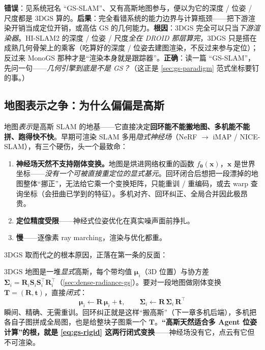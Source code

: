 \begin{pitfall}
\textbf{错误}：见系统冠名 “GS-SLAM”、又有高斯地图参与，便以为它的深度 / 位姿 / 尺度都是 3DGS 算的。\textbf{后果}：完全看错系统的能力边界与计算瓶颈——把下游渲染开销当成定位开销，或高估 GS 的几何能力。\textbf{根因}：3DGS 完全可以只当\emph{下游渲染器}。HI-SLAM2 的深度 / 位姿 / 尺度\emph{全在 DROID 那层算完}，3DGS 只是搭在成熟几何骨架上的乘客（吃算好的深度 / 位姿去建图渲染，不反过来参与定位）；反过来 MonoGS 那种才是“渲染本身就是跟踪器”。\textbf{正确}：读一篇 “GS-SLAM”，先问一句——\emph{几何引擎到底是不是 GS？}（这正是 \cref{sec:gs-paradigm} 范式坐标要钉的事。）
\end{pitfall}

\subsection{地图表示之争：为什么偏偏是高斯}

地图\emph{表示}是高斯 SLAM 的地基——它直接决定\textbf{回环能不能搬地图、多机能不能拼、跑得快不快}。早期可渲染 SLAM 多用\emph{隐式神经场}（NeRF \cite{mildenhall2020nerf} $\to$ iMAP / NICE-SLAM），有三个硬伤，头一个最致命：

\begin{enumerate}
  \item \textbf{神经场天然不支持刚体变换。}地图是烘进网络权重的函数 $f_{\boldsymbol\theta}(\mathbf x)$，$\mathbf x$ 是世界坐标——\emph{没有一个可被直接重定位的显式基元}。回环闭合后想把一段漂掉的地图整体“挪正”，无法给它乘一个变换矩阵，只能重训 / 重编码，或去 warp 查询坐标（会扭曲已学到的特征）。多机对齐、回环纠正、全局合并因此极昂贵。
  \item \textbf{定位精度受限}——神经式位姿优化在真实噪声面前挣扎。
  \item \textbf{慢}——逐像素 ray marching，渲染与优化都重。
\end{enumerate}

3DGS 取而代之的根本原因，正落在第一条的反面：

\begin{insight}[闭式刚体可搬 $=$ 高斯赢下多机的根]
3DGS 地图是一堆\emph{显式}高斯，每个带均值 $\boldsymbol\mu_i$（3D 位置）与协方差 $\boldsymbol\Sigma_i=\mathbf R_i\mathbf S_i\mathbf S_i^\top\mathbf R_i^\top$（\cref{sec:dense-radiance-gs}）。要对一段地图做刚体变换 $\mathbf T=(\mathbf R,\mathbf t)$，直接\emph{闭式}：
\begin{equation}
\boldsymbol\mu_i \leftarrow \mathbf R\,\boldsymbol\mu_i+\mathbf t,\qquad
\boldsymbol\Sigma_i \leftarrow \mathbf R\,\boldsymbol\Sigma_i\,\mathbf R^\top
\label{eq:gs-rigid}
\end{equation}
瞬间、精确、无需重训。回环纠正就是这样“搬高斯”（下一章多机后端），多机把各自子图拼成全局图，也是给整块子图乘一个 $\mathbf T$。\textbf{“高斯天然适合多 Agent 位姿计算”的根，就是 \cref{eq:gs-rigid} 这两行闭式变换}——神经场没有它，点云有它但不可渲染。
\end{insight}

